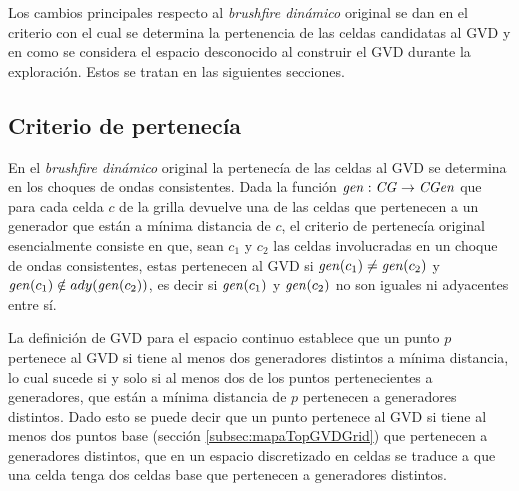 Los cambios principales respecto al \emph{brushfire dinámico} original se dan
en el criterio con el cual se determina la pertenencia de las celdas candidatas
al GVD y en como se considera el espacio desconocido al construir el GVD
durante la exploración. Estos se tratan en las siguientes secciones.

\subsection{Criterio de pertenecía}\label{subsec:critPer}

En el \emph{brushfire dinámico} original la pertenecía de las celdas al GVD se
determina en los choques de ondas consistentes. Dada la función $\mathit{gen} :
\mathit{CG} \rightarrow \mathit{CGen}$ que para cada celda $c$ de la grilla devuelve
una de las celdas que pertenecen a un generador que están a mínima distancia de $c$, el
criterio de pertenecía original esencialmente consiste en que, sean $c_1$ y $c_2$ las celdas
involucradas en un choque de ondas consistentes, estas pertenecen al GVD si
$\mathit{gen}(c_1) \neq \mathit{gen}(c_2)$ y $\mathit{gen}(c_1) \notin
ady(\mathit{gen}(c_2))$, es decir si $\mathit{gen}(c_1)$ y $\mathit{gen}(c_2)$ no son
iguales ni adyacentes entre sí. 



La definición de GVD para el espacio continuo establece que un punto $p$
pertenece al GVD si tiene al menos dos generadores distintos a mínima
distancia, lo cual sucede si y solo si al menos dos de los puntos pertenecientes a
generadores, que están a mínima distancia de $p$ pertenecen a generadores
distintos. Dado esto se puede decir que un punto pertenece al GVD si tiene al
menos dos puntos base (sección \ref{subsec:mapaTopGVDGrid}) que pertenecen a
generadores distintos, que en un espacio discretizado en celdas se traduce
a que una celda tenga dos celdas base que pertenecen a generadores distintos.

